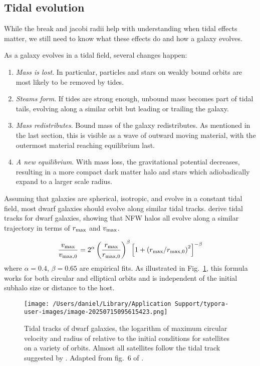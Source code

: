 \subsection{Tidal evolution}\label{tidal-evolution}

While the break and jacobi radii help with understanding when tidal
effects matter, we still need to know what these effects do and how a
galaxy evolves.

As a galaxy evolves in a tidal field, several changes happen:

\begin{enumerate}
\def\labelenumi{\arabic{enumi}.}
\tightlist
\item
  \emph{Mass is lost}. In particular, particles and stars on weakly
  bound orbits are most likely to be removed by tides.
\item
  \emph{Steams form}. If tides are strong enough, unbound mass becomes
  part of tidal tails, evolving along a similar orbit but leading or
  trailing the galaxy.
\item
  \emph{Mass redistributes}. Bound mass of the galaxy redistributes. As
  mentioned in the last section, this is visible as a wave of outward
  moving material, with the outermost material reaching equilibrium
  last.
\item
  \emph{A new equilibrium}. With mass loss, the gravitational potential
  decreases, resulting in a more compact dark matter halo and stars
  which adiobadically expand to a larger scale radius.
\end{enumerate}

Assuming that galaxies are spherical, isotropic, and evolve in a
constant tidal field, most dwarf galaxies should evolve along similar
tidal tracks. \citet{EN2021} derive tidal tracks for dwarf galaxies,
showing that NFW halos all evolve along a similar trajectory in terms of
\(r_{\rm max}\) and \(v_{\rm max}\).

\begin{equation}{
\frac{v_{\rm max}}{v_{\rm max, 0}} = 
2^\alpha 
\left(\frac{r_{\rm max}}{r_{\rm max, 0}}\right)^{\beta}\left[1 + \left(r_{\rm max} / r_{\rm max, 0}\right)^2\right]^{-\beta}
}\end{equation} where \(\alpha=0.4\), \(\beta=0.65\) are empirical fits.
As illustrated in Fig.~\ref{fig:tidal_tracks}, this formula works for
both circular and elliptical orbits and is independent of the initial
subhalo size or distance to the host.

\begin{figure}
\centering
\texttt{[image: /Users/daniel/Library/Application Support/typora-user-images/image-20250715095615423.png]}
\caption[Tidal tracks of dwarf galaxies]{Tidal tracks of dwarf galaxies,
the logarithm of maximum circular velocity and radius of relative to the
initial conditions for satellites on a variety of orbits. Almost all
satellites follow the tidal track suggested by \citet{EN2021}. Adapted
from fig.~6 of \citet{EN2021}.}\label{fig:tidal_tracks}
\end{figure}

